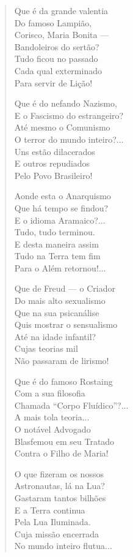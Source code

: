 \begin{verse}
Que é da grande valentia \\
Do famoso Lampião, \\
Corisco, Maria Bonita --- \\
Bandoleiros do sertão? \\
Tudo ficou no passado \\
Cada qual exterminado \\
Para servir de Lição! 

Que é do nefando Nazismo, \\
E o Fascismo do estrangeiro? \\
Até mesmo o Comunismo \\
O terror do mundo inteiro?... \\
Uns estão dilacerados \\
E outros repudiados \\
Pelo Povo Brasileiro! 

Aonde esta o Anarquismo \\
Que há tempo se findou? \\
E o idioma Aramaico?... \\
Tudo, tudo terminou. \\
E desta maneira assim \\
Tudo na Terra tem fim \\
Para o Além retornou!... 


Que de Freud ---  o Criador \\
Do mais alto sexualismo \\
Que na sua psicanálise \\
Quis mostrar o sensualismo \\
Até na idade infantil? \\
Cujas teorias mil \\
Não passaram de lirismo! 

Que é do famoso Rostaing \\
Com a sua filosofia \\
Chamada ``Corpo Fluídico''?... \\
A mais tola teoria...\\
O notável Advogado \\
Blasfemou em seu Tratado \\
Contra o Filho de Maria! 

O que fizeram os nossos \\
Astronautas, lá na Lua? \\
Gastaram tantos bilhões \\
E a Terra continua \\
Pela Lua Iluminada. \\
Cuja missão encerrada \\
No mundo inteiro flutua...


\end{verse}
